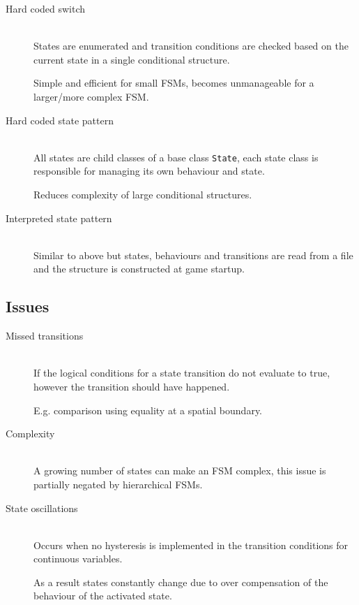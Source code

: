 \documentclass[a4paper]{article}
\begin{document}
\begin{description}
  \item[Hard coded switch] \hfill \\
    States are enumerated and transition conditions are checked based on the
    current state in a single conditional structure.

    Simple and efficient for small FSMs, becomes unmanageable for a larger/more
    complex FSM.

  \item[Hard coded state pattern] \hfill \\
    All states are child classes of a base class \texttt{State}, each state
    class is responsible for managing its own behaviour and state.

    Reduces complexity of large conditional structures.

  \item[Interpreted state pattern] \hfill \\
    Similar to above but states, behaviours and transitions are read from a file
    and the structure is constructed at game startup.

\end{description}

\subsection{Issues}

\begin{description}
  \item[Missed transitions] \hfill \\
    If the logical conditions for a state transition do not evaluate to true,
    however the transition should have happened.

    E.g. comparison using equality at a spatial boundary.

  \item[Complexity] \hfill \\
    A growing number of states can make an FSM complex, this issue is partially
    negated by hierarchical FSMs.

  \item[State oscillations] \hfill \\
    Occurs when no hysteresis is implemented in the transition conditions for
    continuous variables.

    As a result states constantly change due to over compensation of the
    behaviour of the activated state.

\end{description}
\end{document}
